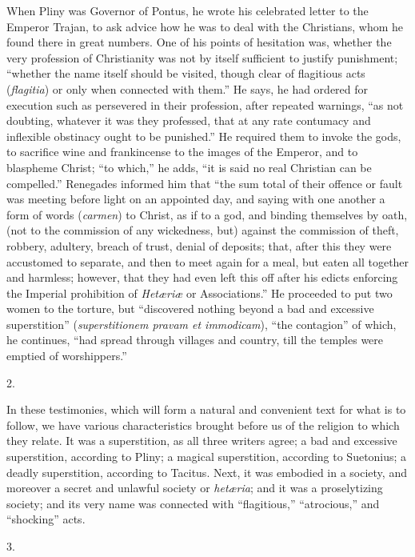 When Pliny was Governor of Pontus, he wrote his
celebrated letter to the Emperor Trajan, to ask advice
how he was to deal with the Christians, whom he found
there in great numbers. One of his points of hesitation
was, whether the very profession of Christianity was not
by itself sufficient to justify punishment; ``whether
the name itself should be visited, though clear of
flagitious acts (\emph{flagitia}) or only when connected
with them.'' He says, he had ordered for execution
such as persevered in their profession, after repeated
warnings, ``as not doubting, whatever it was they
professed, that at any rate contumacy and inflexible
obstinacy ought to be punished.'' He required them to
invoke the gods, to sacrifice wine and frankincense to
the images of the Emperor, and to blaspheme Christ;
``to which,'' he adds, ``it is said no real
Christian can be compelled.'' Renegades informed him
that ``the sum total of their offence or fault was
meeting before light on an appointed day, and saying with
one another a form of words (\emph{carmen}) to Christ, as
if to a god, and binding themselves by oath, (not to the
commission of any wickedness, but) against the commission
of theft, robbery, adultery, breach of trust, denial of
deposits; that, after this they were accustomed to
separate, and then to meet again for a meal, but eaten
all together and harmless; however, that they had even
left this off after his edicts enforcing the Imperial
prohibition of \emph{Hetæriæ} or Associations.'' He
proceeded to put two women to the torture, but ``discovered nothing beyond a bad and excessive
superstition'' (\emph{superstitionem pravam et immodicam}),
``the contagion'' of which, he continues,
``had spread through villages and country, till the
temples were emptied of worshippers.''

2.

In these testimonies, which will form a natural and
convenient text for what is to follow, we have various
characteristics brought before us of the religion to
which they relate. It was a superstition, as all three
writers agree; a bad and excessive superstition,
according to Pliny; a magical superstition, according to
Suetonius; a deadly superstition, according to Tacitus.
Next, it was embodied in a society, and moreover a secret
and unlawful society or \emph{hetæria}; and it was a
proselytizing society; and its very name was connected
with ``flagitious,'' ``atrocious,'' and
``shocking'' acts.

3.


